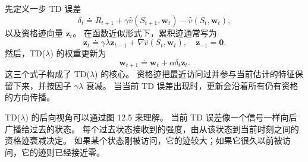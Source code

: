 \documentclass[UTF8,12pt,a4paper,fontset=fandol]{ctexart}
\begin{document}
先定义一步 TD 误差
\begin{equation}
\delta_t\doteq R_{t+1}+\gamma\hat v(S_{t+1},\mathbf{w}_t)-\hat v(S_t,\mathbf{w}_t),
\tag{12.5}
\end{equation}
以及资格迹向量 $\mathbf{z}_t$。
在函数近似形式下，累积迹通常写为
\begin{equation}
\mathbf{z}_t\doteq \gamma\lambda\mathbf{z}_{t-1}
+\nabla\hat v(S_t,\mathbf{w}_t),\quad \mathbf{z}_{-1}=\mathbf{0}.
\tag{12.6}
\end{equation}
然后，TD($\lambda$) 的权重更新为
\begin{equation}
\mathbf{w}_{t+1}\doteq \mathbf{w}_t+\alpha\delta_t\mathbf{z}_t.
\tag{12.7}
\end{equation}
这三个式子构成了 TD($\lambda$) 的核心。
资格迹把最近访问过并参与当前估计的特征保留下来，并按因子 $\gamma\lambda$ 衰减。
当当前 TD 误差出现时，更新会沿着所有仍有资格的方向传播。

\begin{center}
\end{center}

TD($\lambda$) 的后向视角可以通过图 12.5 来理解。
当前 TD 误差像一个信号一样向后广播给过去的状态。
每个过去状态接收到的强度，由从该状态到当前时刻之间的资格迹衰减决定。
如果某个状态刚被访问，它的迹较大；如果它很久以前被访问，它的迹则已经接近零。
\end{document}
